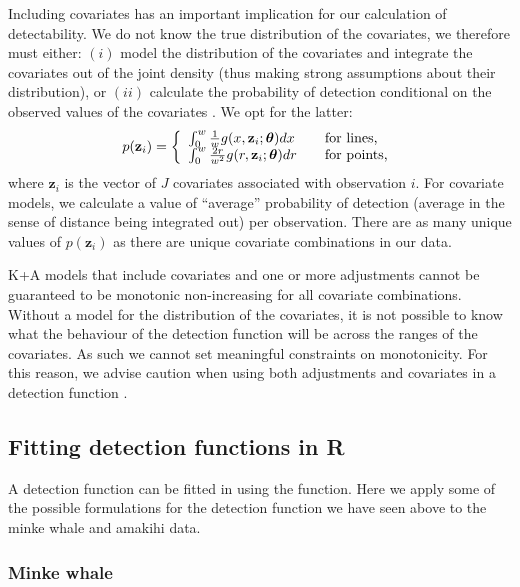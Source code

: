 \documentclass[article]{jss}\usepackage[]{graphicx}\usepackage[]{color}
\begin{document}
Including covariates has an important implication for our calculation of detectability. We do not know the true distribution of the covariates, we therefore must either: $(i)$ model the distribution of the covariates and integrate the covariates out of the joint density (thus making strong assumptions about their distribution), or $(ii)$ calculate the probability of detection conditional on the observed values of the covariates \citep{Marques:2003vb}. We opt for the latter:
$$
p(\mathbf{z}_i) = \left\{
\begin{array}{l l}
\int_0^w \frac{1}{w} g(x, \mathbf{z}_i; \boldsymbol{\theta}) dx & \quad \text{for lines,} \\
\int_0^w \frac{2r}{w^2} g(r, \mathbf{z}_i; \boldsymbol{\theta}) dr & \quad \text{for points,}
\end{array} \right.
$$
where $\mathbf{z}_i$ is the vector of $J$ covariates associated with observation $i$. For covariate models, we calculate a value of ``average'' probability of detection (average in the sense of distance being integrated out) per observation. There are as many unique values of $p(\mathbf{z}_i)$ as there are unique covariate combinations in our data.

K+A models that include covariates and one or more adjustments cannot be guaranteed to be monotonic non-increasing for all covariate combinations. Without a model for the distribution of the covariates, it is not possible to know what the behaviour of the detection function will be across the ranges of the covariates. As such we cannot set meaningful constraints on monotonicity. For this reason, we advise caution when using both adjustments and covariates in a detection function \citep[see][for an example of when this can be problematic]{Miller:2015hw}.


\subsection{Fitting detection functions in R}

A detection function can be fitted in  using the  function. Here we apply some of the possible formulations for the detection function we have seen above to the minke whale and amakihi data.

\subsubsection{Minke whale}
\end{document}

